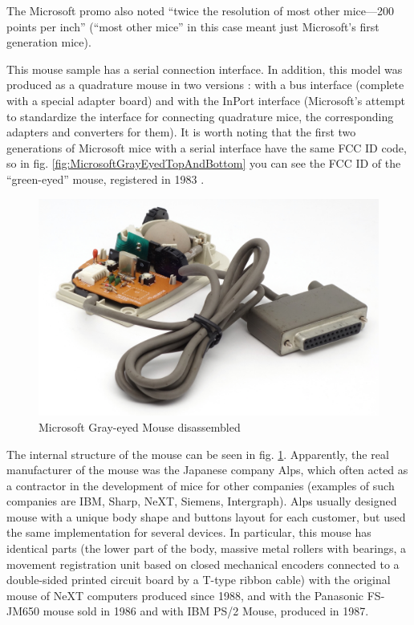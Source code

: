 \documentclass[11pt, a4paper]{article}
\begin{document}
The Microsoft promo also noted ``twice the resolution of most other mice—200 points per inch'' (``most other mice'' in this case meant just Microsoft's first generation mice).

This mouse sample has a serial connection interface. In addition, this model was produced as a quadrature mouse in two versions \cite{guide}: with a bus interface (complete with a special adapter board) and with the InPort interface (Microsoft’s attempt to standardize the interface for connecting quadrature mice, the corresponding adapters and converters for them). It is worth noting that the first two generations of Microsoft mice with a serial interface have the same FCC ID code, so in fig. \ref{fig:MicrosoftGrayEyedTopAndBottom} you can see the FCC ID of the ``green-eyed'' mouse, registered in 1983 \cite{zero}. 

\begin{figure}[h]
    \centering
    \includegraphics[scale=0.5]{1985_microsoft_gray_eyed_mouse/inside_30.jpg}
    \caption{Microsoft Gray-eyed Mouse disassembled}
    \label{fig:MicrosoftGrayEyedInside}
\end{figure}

The internal structure of the mouse can be seen in fig. \ref{fig:MicrosoftGrayEyedInside}. Apparently, the real manufacturer of the mouse was the Japanese company Alps, which often acted as a contractor in the development of mice for other companies (examples of such companies are IBM, Sharp, NeXT,  Siemens, Intergraph). Alps usually designed mouse with a unique body shape and buttons layout for each customer, but used the same implementation for several devices. In particular, this mouse has identical parts (the lower part of the body, massive metal rollers with bearings, a movement registration unit based on closed mechanical encoders connected to a double-sided printed circuit board by a T-type ribbon cable) with the original mouse of NeXT computers produced since 1988, and with the Panasonic FS-JM650 mouse sold in 1986 and with IBM PS/2 Mouse, produced in 1987.
\end{document}
